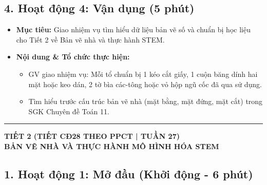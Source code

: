 \documentclass[12pt, a4paper]{article}
\begin{document}
\subsection*{4. Hoạt động 4: Vận dụng (5 phút)}

\begin{itemize}[leftmargin=1.2cm]
    \item[a)] \textbf{Mục tiêu:} Giao nhiệm vụ tìm hiểu dữ liệu bản vẽ số và chuẩn bị học liệu cho Tiết 2 về Bản vẽ nhà và thực hành STEM.
    \item[b)] \textbf{Nội dung & Tổ chức thực hiện:}
    \begin{itemize}[leftmargin=0.6cm]
        \item GV giao nhiệm vụ: Mỗi tổ chuẩn bị 1 kéo cắt giấy, 1 cuộn băng dính hai mặt hoặc keo dán, 2 tờ bìa các-tông hoặc vỏ hộp ngũ cốc đã qua sử dụng.
        \item Tìm hiểu trước cấu trúc bản vẽ nhà (mặt bằng, mặt đứng, mặt cắt) trong SGK Chuyên đề Toán 11.
    \end{itemize}
\end{itemize}

\vspace{10pt}
\hrule
\vspace{10pt}

\begin{center}
    \textbf{\large TIẾT 2 (TIẾT CĐ28 THEO PPCT | TUẦN 27)}\\[4pt]
    \textbf{\large BẢN VẼ NHÀ VÀ THỰC HÀNH MÔ HÌNH HÓA STEM}
\end{center}

\subsection*{1. Hoạt động 1: Mở đầu (Khởi động - 6 phút)}
\end{document}
